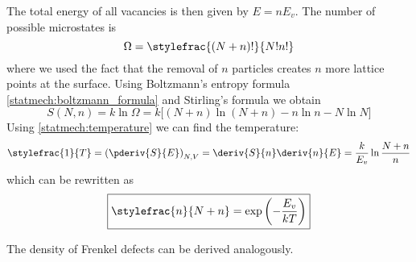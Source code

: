     The total energy of all vacancies is then given by $E = nE_v$. The number of possible microstates is
    \begin{equation}
    	\Omega = \stylefrac{(N+n)!}{N!n!}
	\end{equation}
	where we used the fact that the removal of $n$ particles creates $n$ more lattice points at the surface. Using Boltzmann's entropy formula \ref{statmech:boltzmann_formula} and Stirling's formula we obtain
    \begin{equation}
    	S(N, n) = k\ln\Omega = k\big[(N+n)\ln(N+n) -n\ln n - N\ln N \big]
    \end{equation}
    Using \ref{statmech:temperature} we can find the temperature:
    \begin{equation}
    	\stylefrac{1}{T} = \left(\pderiv{S}{E}\right)_{N, V} = \deriv{S}{n}\deriv{n}{E} = \frac{k}{E_v}\ln\frac{N+n}{n}
    \end{equation}
    which can be rewritten as
    \begin{equation}
    	\boxed{\stylefrac{n}{N + n} = \exp\left(-\frac{E_v}{kT}\right)}
    \end{equation}
    
    The density of Frenkel defects can be derived analogously.

